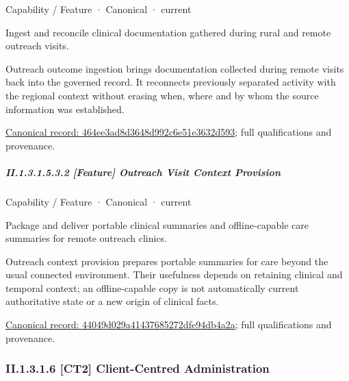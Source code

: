\label{element:464ee3ad8d3648d992c6e51e3632d593}
{\small Capability / Feature · Canonical · current}\par

Ingest and reconcile clinical documentation gathered during rural and remote outreach visits.



Outreach outcome ingestion brings documentation collected during remote visits back into the governed record. It reconnects previously separated activity with the regional context without erasing when, where and by whom the source information was established.


{\footnotesize \href{../../../../continuum/strategy/capability/feature/464ee3ad8d3648d992c6e51e3632d593.md}{Canonical record: 464ee3ad8d3648d992c6e51e3632d593}; full qualifications and provenance.}\par
\subparagraph*{II.1.3.1.5.3.2 [Feature] Outreach Visit Context Provision}
\label{navigation:II.1.3.1.5.3.2}

\label{element:44049d029a41437685272dfe94db4a2a}
{\small Capability / Feature · Canonical · current}\par

Package and deliver portable clinical summaries and offline-capable care summaries for remote outreach clinics.



Outreach context provision prepares portable summaries for care beyond the usual connected environment. Their usefulness depends on retaining clinical and temporal context; an offline-capable copy is not automatically current authoritative state or a new origin of clinical facts.


{\footnotesize \href{../../../../continuum/strategy/capability/feature/44049d029a41437685272dfe94db4a2a.md}{Canonical record: 44049d029a41437685272dfe94db4a2a}; full qualifications and provenance.}\par
\subsubsection*{II.1.3.1.6 [CT2] Client-Centred Administration}
\label{navigation:II.1.3.1.6}

